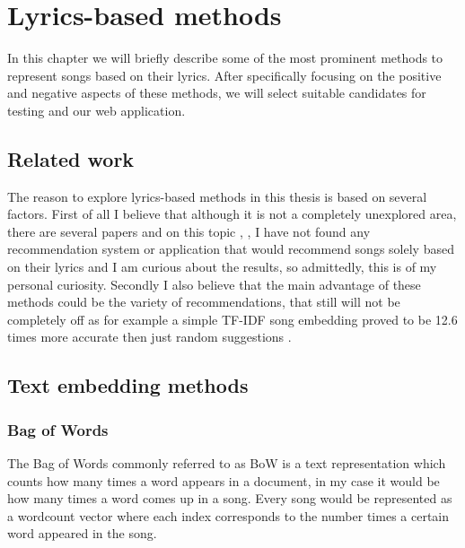 \chapter{Lyrics-based methods}
 In this chapter we will briefly describe some of the most prominent methods to represent songs based on their lyrics. After specifically focusing on the positive and negative aspects of these methods, we will select suitable candidates for testing and our web application.
\section{Related work}

The reason to explore lyrics-based methods in this thesis is based on several factors. First of all I believe that although it is not a completely unexplored area, there are several papers and on this topic \cite{Gossi2016LyricBasedMR}, \cite{DBLP:journals/corr/Tsaptsinos17}, \cite{inproceedings} I have not found any recommendation system or application that would recommend songs solely based on their lyrics and I am curious about the results, so admittedly, this is of my personal curiosity. Secondly I also believe that the main advantage of these methods could be the variety of recommendations, that still will not be completely off as for example a simple TF-IDF song embedding proved to be 12.6 times more accurate then just random suggestions \cite{Gossi2016LyricBasedMR}.

\section{Text embedding methods}
\subsection{Bag of Words}
The Bag of Words commonly referred to as BoW is a text representation which counts how many times a word appears in a document, in my  case it would be how many times a word comes up in a song.
Every song would be represented as a wordcount vector where each index corresponds to the number times a certain word appeared in the song. 
